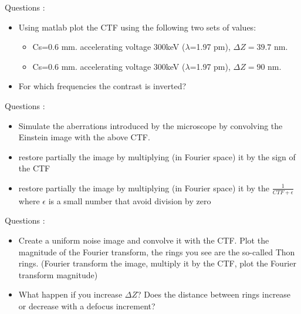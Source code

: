 \documentclass[12pt]{article} %
\newcounter{ejercicioNo}
\begin{document}
\begin{minipage}{\linewidth}
\begin{framed}
\addtocounter{ejercicioNo}{1}
Questions :
\begin{itemize}
   \item Using matlab plot the CTF using the following two sets of values:
        \begin{itemize}
            \item Cs=0.6 mm. accelerating voltage 300keV ($\lambda$=1.97 pm),  $\Delta Z = 39.7$ nm.
            \item Cs=0.6 mm. accelerating voltage 300keV ($\lambda$=1.97 pm),  $\Delta Z = 90$ nm.
        \end{itemize}
   \item For which frequencies the contrast is inverted?
\end{itemize}
\end{framed}
\end{minipage}

\begin{minipage}{\linewidth}
\begin{framed}
\addtocounter{ejercicioNo}{1}
Questions :
\begin{itemize}
   \item Simulate the aberrations introduced by the microscope by convolving the Einstein image
   with the above CTF.
   \item restore partially the image by multiplying (in Fourier space) it by the sign of the CTF
   \item restore partially the image by multiplying (in Fourier space) it by the $\frac{1}{CTF +\epsilon}$   where $\epsilon$ is a small number that avoid division by zero
\end{itemize}
\end{framed}
\end{minipage}

\begin{minipage}{\linewidth}
\begin{framed}
\addtocounter{ejercicioNo}{1}
Questions :
\begin{itemize}
   \item Create a uniform noise image and convolve it with the CTF. Plot the magnitude 
   of the Fourier transform, the rings you see are the so-called Thon rings. (Fourier 
   transform the image, multiply it by the CTF, plot the
   Fourier transform magnitude)
   \item What happen if you increase $\Delta Z$? Does the distance between rings
   increase or decrease with a defocus increment?
\end{itemize}
\end{framed}
\end{minipage}
\end{document}

